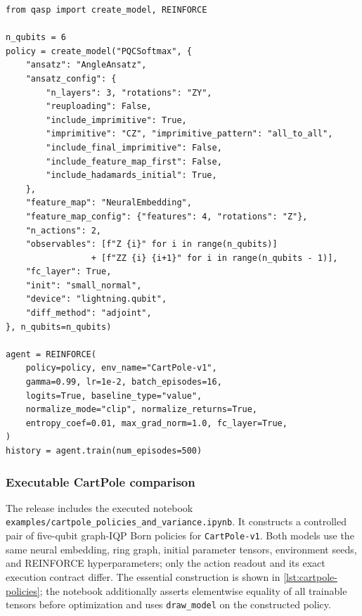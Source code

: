 \documentclass[10pt]{article}
\newcommand{\code}[1]{\texttt{#1}}
\begin{document}
\begin{lstlisting}[caption={Configuration-driven softmax policy and episode-batched REINFORCE.  \code{PQCSoftmax.forward} returns logits, hence \code{logits=True}.},label={lst:rl}]
from qasp import create_model, REINFORCE

n_qubits = 6
policy = create_model("PQCSoftmax", {
    "ansatz": "AngleAnsatz",
    "ansatz_config": {
        "n_layers": 3, "rotations": "ZY",
        "reuploading": False,
        "include_imprimitive": True,
        "imprimitive": "CZ", "imprimitive_pattern": "all_to_all",
        "include_final_imprimitive": False,
        "include_feature_map_first": False,
        "include_hadamards_initial": True,
    },
    "feature_map": "NeuralEmbedding",
    "feature_map_config": {"features": 4, "rotations": "Z"},
    "n_actions": 2,
    "observables": [f"Z {i}" for i in range(n_qubits)]
                 + [f"ZZ {i} {i+1}" for i in range(n_qubits - 1)],
    "fc_layer": True,
    "init": "small_normal",
    "device": "lightning.qubit",
    "diff_method": "adjoint",
}, n_qubits=n_qubits)

agent = REINFORCE(
    policy=policy, env_name="CartPole-v1",
    gamma=0.99, lr=1e-2, batch_episodes=16,
    logits=True, baseline_type="value",
    normalize_mode="clip", normalize_returns=True,
    entropy_coef=0.01, max_grad_norm=1.0, fc_layer=True,
)
history = agent.train(num_episodes=500)
\end{lstlisting}

\subsubsection{Executable CartPole comparison}
\label{sec:cartpole-example}

The release includes the executed notebook
\code{examples/cartpole\_policies\_and\_variance.ipynb}.  It constructs a
controlled pair of five-qubit graph-IQP Born policies for
\code{CartPole-v1}.  Both models use the same neural embedding, ring graph,
initial parameter tensors, environment seeds, and REINFORCE hyperparameters;
only the action readout and its exact execution contract differ.  The essential
construction is shown in \cref{lst:cartpole-policies}; the notebook additionally
asserts elementwise equality of all trainable tensors before optimization and
uses \code{draw\_model} on the constructed policy.
\end{document}
